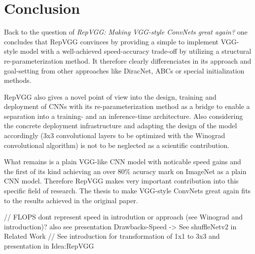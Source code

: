 \section{Conclusion} \label{conclusion}

Back to the question of \textit{RepVGG: Making VGG-style ConvNets great again?} one concludes that RepVGG convinces by providing a simple to implement VGG-style model with a well-achieved speed-accuracy trade-off by utilizing a structural re-parameterization method. It therefore clearly differenciates in its approach and goal-setting from other approaches like DiracNet, ABCs or special initialization methods. 

RepVGG also gives a novel point of view into the design, training and deployment of CNNs with its re-parameterization method as a bridge to enable a separation into a training- and an inference-time architecture. Also considering the concrete deployment infrastructure and adapting the design of the model accordingly (3x3 convolutional layers to be optimized with the Winograd convolutional algorithm) is not to be neglected as a scientific contribution. 

What remains is a plain VGG-like CNN model with noticable speed gains and the first of its kind achieving an over 80\% acuracy mark on ImageNet \cite{JiaDeng.2009} as a plain CNN model. Therefore RepVGG makes very important contribution into this specific field of research. The thesis to make VGG-style ConvNets great again fits to the results achieved in the original paper. 



// FLOPS dont represent speed in introdution or approach (see Winograd and introduction)? also see presentation Drawbacks-Speed -> See shuffleNetv2 in Related Work
// See introduction for transformation of 1x1 to 3x3 and presentation in Idea:RepVGG